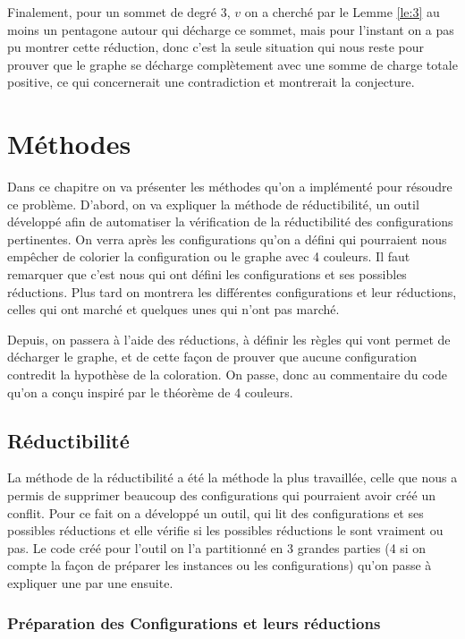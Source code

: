\documentclass[10pt,a4paper]{article}
\begin{document}
Finalement, pour un sommet de degré 3, $v$ on a cherché par le Lemme \ref{le:3} au moins un pentagone autour qui décharge ce sommet, mais pour l'instant on a pas pu montrer cette réduction, donc c'est la seule situation qui nous reste pour prouver que le graphe se décharge complètement avec une somme de charge totale positive, ce qui concernerait une contradiction et montrerait la conjecture.

\section{Méthodes}

Dans ce chapitre on va présenter les méthodes qu'on a implémenté pour résoudre ce problème. D'abord, on va expliquer la méthode de réductibilité, un outil développé afin de automatiser la vérification de la réductibilité des configurations pertinentes. On verra après les configurations qu'on a défini qui pourraient nous empêcher de colorier la configuration ou le graphe avec 4 couleurs. Il faut remarquer que c'est nous qui ont défini les configurations et ses possibles réductions. Plus tard on montrera les différentes configurations et leur réductions, celles qui ont marché et quelques unes qui n'ont pas marché. 

Depuis, on passera à l'aide des réductions, à définir les règles qui vont permet de décharger le graphe, et de cette façon de prouver que aucune configuration contredit la hypothèse de la coloration. On passe, donc au commentaire du code qu'on a conçu inspiré par le théorème de 4 couleurs.


\subsection{Réductibilité}

La méthode de la réductibilité a été la méthode la plus travaillée, celle que nous a permis de supprimer beaucoup des configurations qui pourraient avoir créé un conflit. Pour ce fait on a développé un outil, qui lit des configurations et ses possibles réductions et elle vérifie si les possibles réductions le sont vraiment ou pas. Le code créé pour l'outil on l'a partitionné en 3 grandes parties (4 si on compte la façon de préparer les instances ou les configurations) qu'on passe à expliquer une par une ensuite.

\subsubsection{Préparation des Configurations et leurs réductions}
\end{document}

